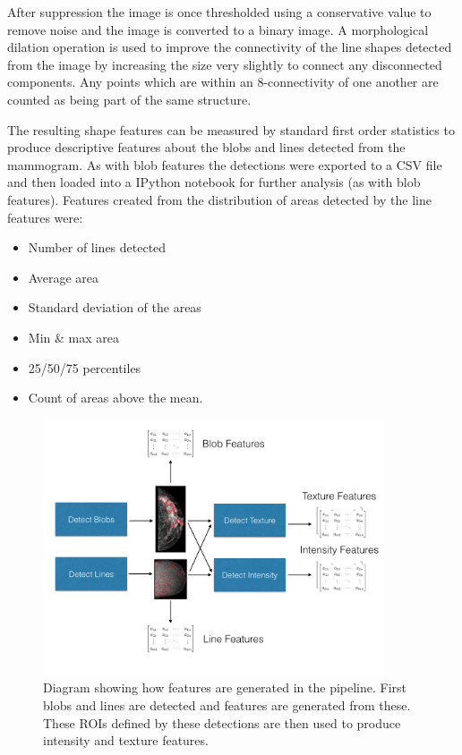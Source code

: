 After suppression the image is once thresholded using a conservative value to remove noise and the image is converted to a binary image. A morphological dilation operation is used to improve the connectivity of the line shapes detected from the image by increasing the size very slightly to connect any disconnected components. Any points which are within an 8-connectivity of one another are counted as being part of the same structure.

The resulting shape features can be measured by standard first order statistics to produce descriptive features about the blobs and lines detected from the mammogram. As with blob features the detections were exported to a CSV file and then loaded into a IPython notebook for further analysis (as with blob features). Features created from the distribution of areas detected by the line features were:

\begin{itemize}
	\item Number of lines detected
	\item Average area
	\item Standard deviation of the areas
	\item Min \& max area
	\item 25/50/75 percentiles
	\item Count of areas above the mean.
\end{itemize}

\begin{figure}[H]
	\label{fig:feature-diagram}
	\centering
	\includegraphics[width=0.9\textwidth]{Images/features-diagram.png}	
	\caption{Diagram showing how features are generated in the pipeline. First blobs and lines are detected and features are generated from these. These ROIs defined by these detections are then used to produce intensity and texture features.}
\end{figure}



